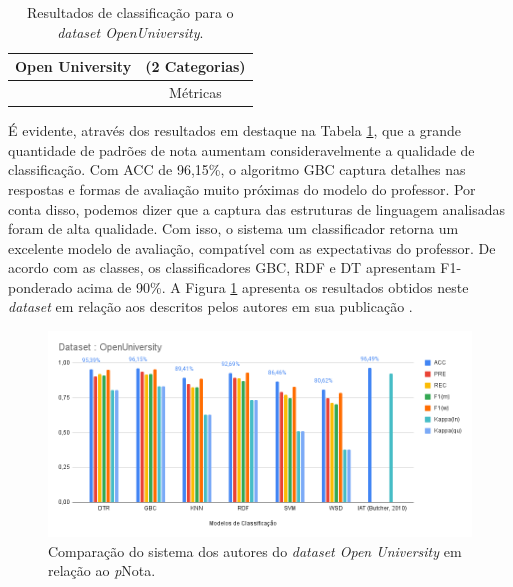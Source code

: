 \begin{table}[!h]
\begin{center}
\begin{tabular}{l r r r r r r r}
    \hline
    \multicolumn{7}{l}{\textbf{Open University}} &  (2 Categorias) \\ \hline
     & \multicolumn{7}{c}{M{\'e}tricas} \\ \cline{2-8}

    

    \hline
    \hline
\end{tabular}
\end{center}
\caption{Resultados de classificação para o \textit{dataset OpenUniversity}.}
\label{tab-OU75}
\end{table}

É evidente, através dos resultados em destaque na Tabela \ref{tab-OU75}, que a grande quantidade de padrões de nota aumentam consideravelmente a qualidade de classificação. Com ACC de 96,15\%, o algoritmo GBC captura detalhes nas respostas e formas de avaliação muito próximas do modelo do professor. Por conta disso, podemos dizer que a captura das estruturas de linguagem analisadas foram de alta qualidade. Com isso, o sistema um classificador retorna um excelente modelo de avaliação, compatível com as expectativas do professor. De acordo com as classes, os classificadores GBC, RDF e DT apresentam F1-ponderado acima de 90\%. A Figura \ref{fig-OU75} apresenta os resultados obtidos neste \textit{dataset} em relação aos descritos pelos autores em sua publicação \cite{butcher2010}.

\begin{figure}[!h]
\centering
\includegraphics[width=\textwidth]{figuras/OU-75.png}
\caption{Comparação do sistema dos autores do \textit{dataset Open University} em relação ao \textit{p}Nota.}
\label{fig-OU75}
\end{figure}

